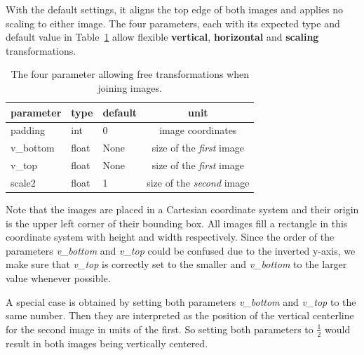 \documentclass[a4paper, 12pt, bibliography=totoc]{scrartcl}
\begin{document}


With the default settings, it aligns the top edge of both images and applies no scaling to either image.
The four parameters, each with its expected type and default value in Table~\ref{tab:svgjoin} allow flexible \textbf{vertical}, \textbf{horizontal} and \textbf{scaling} transformations.
\begin{table}[h]
	\centering
	\begin{tabular}{|lllc|}
		
		\hline
	   parameter& type & default & unit\\
		\hline\hline
		 padding& int & 0&  image coordinates\\
		 
		  v\_bottom& float & None & size of the \textit{first} image\\
		  
		  v\_top& float & None & size of the \textit{first} image\\
		  
		 scale2& float & 1 & size of the \textit{second} image\\
		 
		 \hline\hline
	\end{tabular}
	\caption{The four parameter allowing free transformations when joining images.}\label{tab:svgjoin}
\end{table}

Note that the images are placed in a Cartesian coordinate system and their origin is the upper left corner of their bounding box. All images fill a rectangle in this coordinate system with height and width respectively.
Since the order of the parameters \textit{v\_bottom} and \textit{v\_top} could be confused due to the inverted y-axis, we make sure that \textit{v\_top} is correctly set to the smaller and \textit{v\_bottom} to the larger value whenever possible.

A special case is obtained by setting both parameters \textit{v\_bottom} and \textit{v\_top} to the same number. Then they are interpreted as the position of the vertical centerline for the second image in units of the first. So setting both parameters to $\frac{1}{2}$ would result in both images being vertically centered.\\
\end{document}
